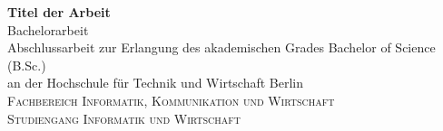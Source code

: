 % 
% 
\thispagestyle{empty}

\hspace{20cm}
\vspace{-2cm}

\begin{center}
  \huge{\bf Titel der Arbeit} \\ %
  \vspace{1cm}
  \LARGE  Bachelorarbeit \\ %
  \vspace{0.3cm}
  \large Abschlussarbeit zur Erlangung des akademischen Grades Bachelor of Science (B.Sc.) \\
an der Hochschule für Technik und Wirtschaft Berlin \\ %
  \vspace{1cm}
  {\large
      \scshape
      Fachbereich Informatik, Kommunikation und Wirtschaft \\
      Studiengang Informatik und Wirtschaft\\
  } 
\end{center}
\vspace {0.5 cm}%
